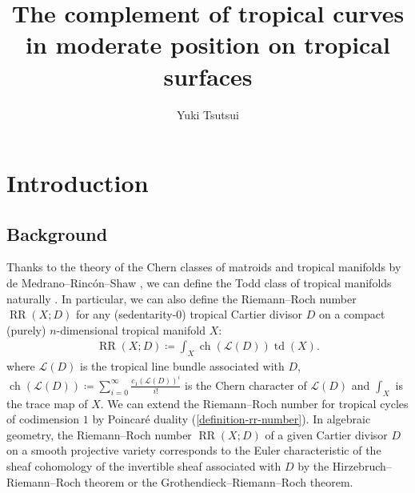 \documentclass[a4paper,dvipdfmx,reqno,12pt]{amsart}
\title{The complement of tropical curves in moderate position on
tropical surfaces}
\author[Y. Tsutsui]{Yuki Tsutsui}
\theoremstyle{definition}
\newcommand{\deq}{\coloneqq}
\newcommand{\opn}[1]{\operatorname{#1}}
\numberwithin{equation}{section}
\begin{document}
\begin{abstract}
\end{abstract}

\maketitle

\section{Introduction}
\subsection{Background}
Thanks to the theory of the Chern classes of
matroids and tropical manifolds by 
de Medrano--Rinc\'on--Shaw
\cite{MR3999674,demedrano2023chern},
we can define the Todd class of tropical manifolds
naturally \cite[Conjecture 6.13]{demedrano2023chern}.
In particular, we can also define the Riemann--Roch
number $\opn{RR}(X;D)$ for any (sedentarity-0)
tropical Cartier divisor $D$ on
a compact (purely) $n$-dimensional tropical manifold $X$:
\begin{align}
\label{equation-intro-rr}
\opn{RR}(X;D)\deq 
\int_{X}\opn{ch}(\mathcal{L}(D))\opn{td}(X).
\end{align}
where $\mathcal{L}(D)$ is the 
tropical line bundle associated with $D$,
$\opn{ch}(\mathcal{L}(D))\deq 
\sum_{i=0}^{\infty}\frac{c_1(\mathcal{L}(D))^{i}}{i!}$
is the Chern character of $\mathcal{L}(D)$
and $\int_X$ is the trace map of $X$.
We can extend the Riemann--Roch number for
tropical cycles of codimension $1$
by Poincar\'e duality
(\cref{definition-rr-number}).
In algebraic geometry, the Riemann--Roch number
$\opn{RR}(X;D)$ of a given Cartier divisor $D$
on a smooth projective variety
corresponds to
the Euler characteristic of the sheaf cohomology
of the invertible sheaf 
associated with $D$ by the Hirzebruch--Riemann--Roch theorem
or the Grothendieck--Riemann--Roch theorem.
\end{document}
